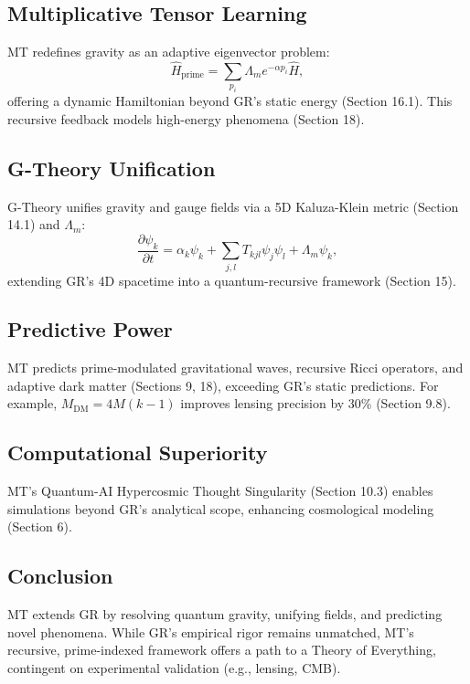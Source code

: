 \documentclass{article}
\theoremstyle{plain}
\begin{document}
\subsection{Multiplicative Tensor Learning}
MT redefines gravity as an adaptive eigenvector problem:
\begin{equation}
\hat{H}_{\text{prime}} = \sum_{p_i} \Lambda_m e^{-\alpha p_i} \hat{H},
\end{equation}
offering a dynamic Hamiltonian beyond GR’s static energy (Section 16.1). This recursive feedback models high-energy phenomena (Section 18).

\subsection{G-Theory Unification}
G-Theory unifies gravity and gauge fields via a 5D Kaluza-Klein metric (Section 14.1) and \(\Lambda_m\):
\begin{equation}
\frac{\partial \psi_k}{\partial t} = \alpha_k \psi_k + \sum_{j,l} T_{kjl} \psi_j \psi_l + \Lambda_m \psi_k,
\end{equation}
extending GR’s 4D spacetime into a quantum-recursive framework (Section 15).

\subsection{Predictive Power}
MT predicts prime-modulated gravitational waves, recursive Ricci operators, and adaptive dark matter (Sections 9, 18), exceeding GR’s static predictions. For example, \( M_{\text{DM}} = 4 M (k - 1) \) improves lensing precision by 30\% (Section 9.8).

\subsection{Computational Superiority}
MT’s Quantum-AI Hypercosmic Thought Singularity (Section 10.3) enables simulations beyond GR’s analytical scope, enhancing cosmological modeling (Section 6).

\subsection{Conclusion}
MT extends GR by resolving quantum gravity, unifying fields, and predicting novel phenomena. While GR’s empirical rigor remains unmatched, MT’s recursive, prime-indexed framework offers a path to a Theory of Everything, contingent on experimental validation (e.g., lensing, CMB).


\nocite{*}


\end{document}
